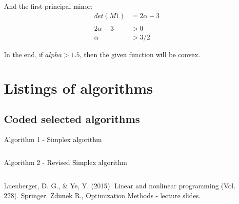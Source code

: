 \documentclass[eng,openany]{mgr}
\begin{document}
And the first principal minor:\\
\begin{align*}
det(M1) &= 2\alpha - 3\\
\\
2\alpha -3 &> 0\\
\alpha &> 3/2
\end{align*}

In the end, if $alpha > 1.5$, then the given function will be convex.

\clearpage
\chapter{Listings of algorithms}
\section{Coded selected algorithms}
Algorithm 1 - Simplex algorithm\\ 
\begin{lstlisting}

\end{lstlisting}
\newpage
Algorithm 2 - Revised Simplex algorithm\\
\begin{lstlisting}

\end{lstlisting}
\begin{thebibliography}{8}
Luenberger, D. G., \& Ye, Y. (2015). Linear and nonlinear programming (Vol. 228). Springer.
Zdunek R., Optimization Methods - lecture slides.
\end{thebibliography}
\end{document}
